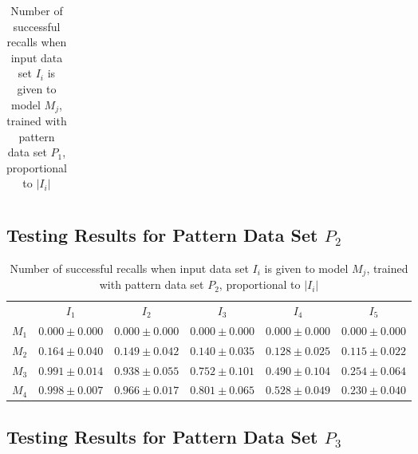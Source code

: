 \documentclass[12pt]{article}
\begin{document}
\begin{appendices}
\begin{table}[H]
\begin{tabular}{cccccc}
    \end{tabular}
    \caption{Number of successful recalls when input data set $I_i$ is given to model $M_j$, trained with pattern data set $P_{1}$, proportional to $\left|I_i\right|$}
    \end{table}
    
\subsection{Testing Results for Pattern Data Set $P_{2}$}


    \begin{table}[H]
    \centering
    \def\arraystretch{1.5}
    \footnotesize
    \begin{tabular}{cccccc}
    
 & $I_{1}$  & $I_{2}$  & $I_{3}$  & $I_{4}$  & $I_{5}$ \\ \cline{2-6}
$M_{1}$  & $0.000\pm0.000$  & $0.000\pm0.000$  & $0.000\pm0.000$  & $0.000\pm0.000$  & $0.000\pm0.000$ \\
$M_{2}$  & $0.164\pm0.040$  & $0.149\pm0.042$  & $0.140\pm0.035$  & $0.128\pm0.025$  & $0.115\pm0.022$ \\
$M_{3}$  & $0.991\pm0.014$  & $0.938\pm0.055$  & $0.752\pm0.101$  & $0.490\pm0.104$  & $0.254\pm0.064$ \\
$M_{4}$  & $0.998\pm0.007$  & $0.966\pm0.017$  & $0.801\pm0.065$  & $0.528\pm0.049$  & $0.230\pm0.040$ \\

    \end{tabular}
    \caption{Number of successful recalls when input data set $I_i$ is given to model $M_j$, trained with pattern data set $P_{2}$, proportional to $\left|I_i\right|$}
    \end{table}
    
\subsection{Testing Results for Pattern Data Set $P_{3}$}


    \begin{table}[H]
    \centering
    \def\arraystretch{1.5}
    \footnotesize
    \begin{tabular}{cccccc}
    

\end{tabular}
\end{table}
\end{appendices}
\end{document}
